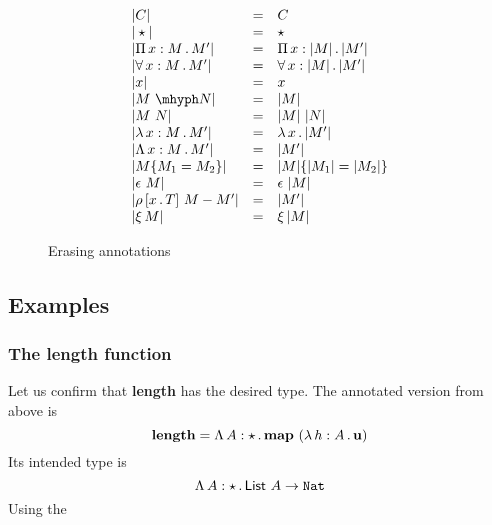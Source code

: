 \documentclass{article}
\begin{document}
\begin{figure}
  \[
  \begin{array}{lll}
    |C| & = & C \\
    |\star| & = & \star \\
    |\Pia{x}{M}{M'}| & = & \Pia{x}{|M|}{|M'|} \\
    |\allt{x}{M}{M'}| & = & \allt{x}{|M|}{|M'|} \\
    |x| & = & x \\
    |\appe{M}{N}| & = & |M| \\    
    |M\ N| & = & |M|\ |N| \\
    |\tlam{x}{M}{M'}| & = & \lam{x}{|M'|} \\
    |\Tlam{x}{M}{M'}| & = & |M'| \\
    |\eqtm{M_1}{M}{M_2}| & = & \eqtm{|M_1|}{|M|}{|M_2|}\\
    |\rfl{M}| & = & \rfl{|M|} \\
    |\cng{x}{T}{M}{M'}| & = & |M'| \\
    |\ext{M}| & = & \ext{|M|}
  \end{array}
  \]
  \caption{Erasing annotations}
  \label{fig:erase}
\end{figure}


\subsection{Examples}

\subsubsection{The length function}

Let us confirm that \textbf{length} has the desired type.  The annotated version from above is
\[
\mathbf{length} = \Tlam{A}{\star}{\mathbf{map}\ (\tlam{h}{A}{\mathbf{u}})}
\]
\noindent Its intended type is
\[
\Lambda\, A : \star\, .\, \mathsf{List}\ A \to \texttt{Nat}
\]
\noindent Using the 

 
\end{document}
